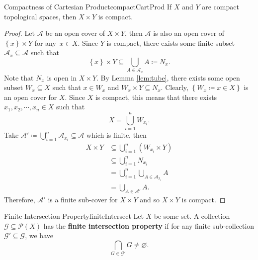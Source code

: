 \documentclass[math]{amznotes}
\theoremstyle{remark}
\begin{document}
\begin{corbox}{Compactness of Cartesian Product}{compactCartProd}
    If $X$ and $Y$ are compact topological spaces, then $X \times Y$ is compact.
    \tcblower
    \begin{proof}
        Let $\mathcal{A}$ be an open cover of $X \times Y$, then $\mathcal{A}$ is also an open cover of $\left\{x\right\} \times Y$ for any~$x \in X$. Since $Y$ is compact, there exists some finite subset $\mathcal{A}_x \subseteq \mathcal{A}$ such that 
        \begin{equation*}
            \left\{x\right\} \times Y \subseteq \bigcup_{A \in \mathcal{A}_x}A \coloneqq N_x.
        \end{equation*}
        Note that $N_x$ is open in $X \times Y$. By Lemma \ref{lem:tube}, there exists some open subset $W_x \subseteq X$ such that $x \in W_x$ and $W_x \times Y \subseteq N_x$. Clearly, $\left\{W_x \coloneqq x \in X\right\}$ is an open cover for $X$. Since $X$ is compact, this means that there exists $x_1, x_2, \cdots, x_n \in X$ such that 
        \begin{equation*}
            X = \bigcup_{i = 1}^nW_{x_i}.
        \end{equation*}
        Take $\mathcal{A}' \coloneqq \bigcup_{i = 1}^n\mathcal{A}_{x_i} \subseteq \mathcal{A}$ which is finite, then 
        \begin{align*}
            X \times Y & \subseteq \bigcup_{i = 1}^n\left(W_{x_i} \times Y\right) \\
            & \subseteq \bigcup_{i = 1}^nN_{x_i} \\
            & = \bigcup_{i = 1}^n\bigcup_{A \in \mathcal{A}_{x_i}}A \\
            & = \bigcup_{A \in \mathcal{A}'}A.
        \end{align*}
        Therefore, $\mathcal{A}'$ is a finite sub-cover for $X \times Y$ and so $X \times Y$ is compact.
    \end{proof}
\end{corbox}
\begin{dfnbox}{Finite Intersection Property}{finiteIntersect}
    Let $X$ be some set. A collection $\mathcal{G} \subseteq \mathcal{P}\left(X\right)$ has the {\color{red} \textbf{finite intersection property}} if for any finite sub-collection $\mathcal{G}' \subseteq \mathcal{G}$, we have 
    \begin{equation*}
        \bigcap_{G \in \mathcal{G}'}G \neq \varnothing.
    \end{equation*}
\end{dfnbox}
\end{document}

